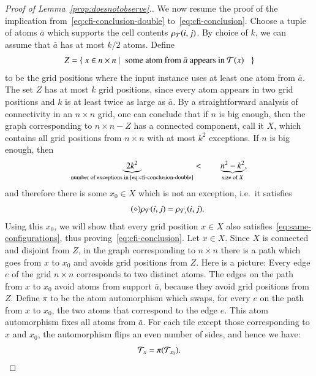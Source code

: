 \begin{proof}[Proof of Lemma~\ref{prop:doesnotobserve}.]
We now resume the proof of the implication from~\eqref{eq:cfi-conclusion-double} to~\eqref{eq:cfi-conclusion}. Choose a tuple of atoms $\bar a$ which supports  the cell contents $\rho_{\mathcal T}(i,j)$. By choice of $k$, we can assume that $\bar a$ has at most $k/2$ atoms. 
Define 
\begin{align*}
 Z = \setbuild{ x \in n \times n }{some atom from $\bar a$ appears in $\Tt(x)$ } 
\end{align*}
to be the grid positions where the input instance uses at least one atom from $\bar a$. 
The set $Z$ has at most $k$ grid positions, since every atom appears in two grid positions and $k$ is at least twice as large as  $\bar a$. By a straightforward analysis of connectivity in an $n \times n$ grid, one can conclude that if $n$ is big enough, then the graph corresponding to $n \times n - Z$ has a connected component, call it $X$, which contains all grid positions from $n \times n$ with at most $k^2$ exceptions. 
If $n$ is big enough, then
\begin{align*}
 \underbrace{2k^2}_{\text{number of exceptions in~\eqref{eq:cfi-conclusion-double}}} < \qquad \underbrace{n^2-k^2}_{\text{size of $X$}},
\end{align*}
and therefore there is some $x_0 \in X$ which is not an exception, i.e.~it satisfies
\begin{align}
\tag{$\diamond$}\label{eq:same-configurations}\rho_{\mathcal T}(i,j) = \rho_{{\mathcal T}_x}(i,j).
\end{align}
Using this $x_0$, we will show that every grid position $x \in X$ also satisfies~\eqref{eq:same-configurations}, thus proving~\eqref{eq:cfi-conclusion}. Let $x \in X$. Since $X$ is connected and disjoint from $Z$, in the graph corresponding to $n \times n$ there is a path which goes from $x$ to $x_0$ and avoids grid positions from $Z$. Here is a picture: 
Every edge $e$ of the grid $n \times n$ corresponds to two distinct atoms. The edges on the path from $x$ to $x_0$ avoid atoms from support $\bar a$, because they avoid grid positions from $Z$. Define $\pi$ to be the atom automorphism which swaps, for every $e$ on the path from $x$ to $x_0$, the two atoms that correspond to the edge $e$. This atom automorphism fixes all atoms from $\bar a$. For each tile except those corresponding to $x$ and $x_0$, the automorphism flips an even number of sides, and hence we have:
\begin{align}\label{eq:xy-flip}
 {\mathcal T}_{x} = \pi({\mathcal T}_{x_0}).
\end{align}

\end{proof}
